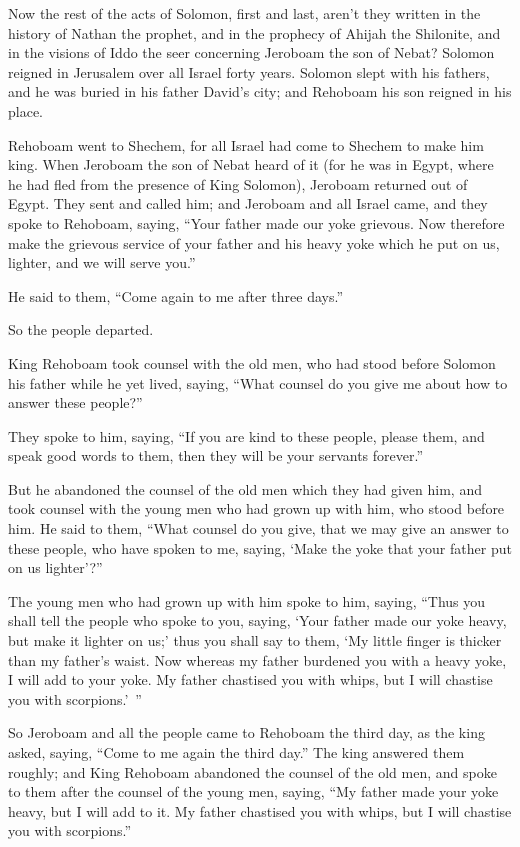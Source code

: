 \myverse{}Now the rest of the acts of Solomon, first and last, aren’t they
written in the history of Nathan the prophet, and in the prophecy of Ahijah the Shilonite, and in the
visions of Iddo the seer concerning Jeroboam the son of Nebat?
\myverse{}Solomon reigned in Jerusalem over all Israel forty years.
\myverse{}Solomon slept with his fathers, and he was buried in his father David’s city;
and Rehoboam his son reigned in his place.


\mychapter{} \myverse*{}Rehoboam went to Shechem, for all Israel had come to Shechem to
make him king.
\myverse{}When Jeroboam the son of Nebat heard of it (for he was in Egypt, where he had
fled from the presence of King Solomon), Jeroboam returned out of Egypt.
\myverse{}They sent and called him; and Jeroboam and all Israel came, and they spoke
to Rehoboam, saying,
\myverse{}“Your father made our yoke grievous. Now therefore make the grievous service
of your father and his heavy yoke which he put on us, lighter, and we will serve you.”

\myverse{}He said to them, “Come again to me after three days.”

So the people departed.

\myverse{}King Rehoboam took counsel with the old men, who had stood before
Solomon his father while he yet lived, saying, “What counsel do you give me about how to answer these
people?”

\myverse{}They spoke to him, saying, “If you are kind to these people, please
them, and speak good words to them, then they will be your servants forever.”

\myverse{}But he abandoned the counsel of the old men which they had given
him, and took counsel with the young men who had grown up with him, who stood before him.
\myverse{}He said to them, “What counsel do you give, that we may give an answer to these
people, who have spoken to me, saying, ‘Make the yoke that your father put on us lighter’?”

\myverse{}The young men who had grown up with him spoke to him, saying,
“Thus you shall tell the people who spoke to you, saying, ‘Your father made our yoke heavy, but make it
lighter on us;’ thus you shall say to them, ‘My little finger is thicker than my father’s waist.
\myverse{}Now whereas my father burdened you with a heavy yoke, I will add to your
yoke. My father chastised you with whips, but I will chastise you with scorpions.’ ”

\myverse{}So Jeroboam and all the people came to Rehoboam the third day,
as the king asked, saying, “Come to me again the third day.”
\myverse{}The king answered them roughly; and King Rehoboam abandoned the counsel of
the old men,
\myverse{}and spoke to them after the counsel of the young men, saying, “My father
made your yoke heavy, but I will add to it. My father chastised you with whips, but I will chastise you
with scorpions.”


